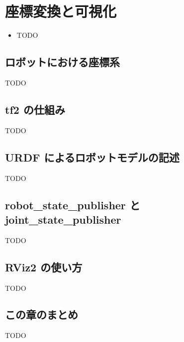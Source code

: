\chapter{座標変換と可視化}
\label{chap:tf_viz}

\begin{goalbox}
  \begin{itemize}
    \item TODO
  \end{itemize}
\end{goalbox}

\section{ロボットにおける座標系}

TODO

\section{tf2 の仕組み}

TODO

\section{URDF によるロボットモデルの記述}

TODO

\section{robot\_state\_publisher と joint\_state\_publisher}

TODO

\section{RViz2 の使い方}

TODO

\section*{この章のまとめ}

TODO

